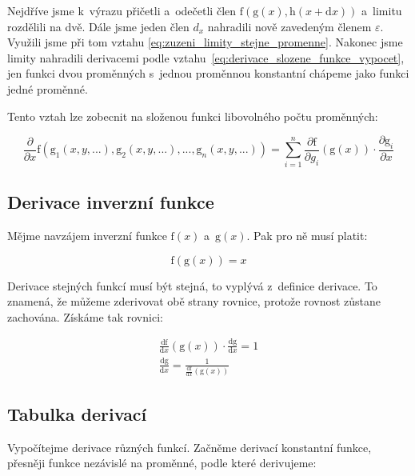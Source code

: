 Nejdříve jsme k~výrazu přičetli a~odečetli člen \(\mathrm{f}(\mathrm{g}(x), \mathrm{h}(x + \mathrm{d}x))\) a~limitu rozdělili na dvě. Dále jsme jeden člen \(d_x\) nahradili nově zavedeným členem \(\varepsilon\). Využili jsme při tom vztahu \eqref{eq:zuzeni_limity_stejne_promenne}.
Nakonec jsme limity nahradili derivacemi podle vztahu~\eqref{eq:derivace_slozene_funkce_vypocet}, jen funkci dvou proměnných s~jednou proměnnou konstantní chápeme jako funkci jedné proměnné.

Tento vztah lze zobecnit na složenou funkci libovolného počtu proměnných:

\begin{equation}
\frac{\partial}{\partial x} \mathrm{f} (\mathrm{g}_1(x, y, ...), \mathrm{g}_2(x, y, ...), ..., \mathrm{g}_n(x, y, ...)) = \sum_{i=1}^n \frac{\partial \mathrm{f}}{\partial g_i}(\mathrm{g}(x)) \cdot \frac{\partial \mathrm{g}_i}{\partial x}
\end{equation}

\subsection{Derivace inverzní funkce}

Mějme navzájem inverzní funkce \(\mathrm{f}(x)\) a~\(\mathrm{g}(x)\). Pak pro ně musí platit:

\begin{equation}
\mathrm{f}(\mathrm{g}(x)) = x
\end{equation}

Derivace stejných funkcí musí být stejná, to vyplývá z~definice derivace. To znamená, že můžeme zderivovat obě strany rovnice, protože rovnost zůstane zachována. Získáme tak rovnici:

\begin{equation}
\label{eq:derivace_inverzni_funkce}
\begin{split}
\frac{\mathrm{df}}{\mathrm{d}x}(\mathrm{g}(x)) \cdot \frac{\mathrm{dg}}{\mathrm{d}x} = 1 \\
\frac{\mathrm{dg}}{\mathrm{d}x} = \frac{1}{\frac{\mathrm{df}}{\mathrm{d}x}(\mathrm{g}(x))}
\end{split}
\end{equation}

\subsection{Tabulka derivací}

Vypočítejme derivace různých funkcí. Začněme derivací konstantní funkce, přesněji funkce nezávislé na proměnné, podle které derivujeme:

